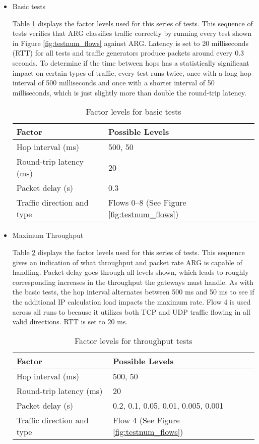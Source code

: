 \begin{itemize}
	\item Basic tests
	\par Table \ref{tbl:basic_factors} displays the factor levels used for this series of tests. This sequence of tests verifies that \ac{ARG} classifies traffic correctly by running every test shown in Figure \ref{fig:testnum_flows} against \ac{ARG}. Latency is set to 20 milliseconds (\ac{RTT}) for all tests and traffic generators produce packets around every 0.3 seconds. To determine if the time between hops has a statistically significant impact on certain types of traffic, every test runs twice, once with a long hop interval of 500 milliseconds and once with a shorter interval of 50 milliseconds, which is just slightly more than double the round-trip latency.

\begin{table}
\caption{Factor levels for basic tests}
\label{tbl:basic_factors}
\centering
\begin{tabular}{ll}
\toprule
\textbf{Factor} & \textbf{Possible Levels} \\
\hline
Hop interval (ms) & 500, 50\\
Round-trip latency (ms) & 20\\
Packet delay (s) & 0.3\\
Traffic direction and type & Flows 0--8 (See Figure \ref{fig:testnum_flows})\\
\bottomrule
\end{tabular}
\end{table}

	\item Maximum Throughput
	\par Table \ref{tbl:throughput_factors} displays the factor levels used for this series of tests. This sequence gives an indication of what throughput and packet rate \ac{ARG} is capable of handling. Packet delay goes through all levels shown, which leads to roughly corresponding increases in the throughput the gateways must handle. As with the basic tests, the hop interval alternates between 500 ms and 50 ms to see if the additional \ac{IP} calculation load impacts the maximum rate. Flow 4 is used across all runs to because it utilizes both \ac{TCP} and \ac{UDP} traffic flowing in all valid directions. \ac{RTT} is set to 20 ms.

\begin{table}
\caption{Factor levels for throughput tests}
\label{tbl:throughput_factors}
\centering
\begin{tabular}{ll}
\toprule
\textbf{Factor} & \textbf{Possible Levels} \\
\hline
Hop interval (ms) & 500, 50\\
Round-trip latency (ms) & 20\\
Packet delay (s) & 0.2, 0.1, 0.05, 0.01, 0.005, 0.001\\
Traffic direction and type & Flow 4 (See Figure \ref{fig:testnum_flows})\\
\bottomrule
\end{tabular}
\end{table}


\end{itemize}
